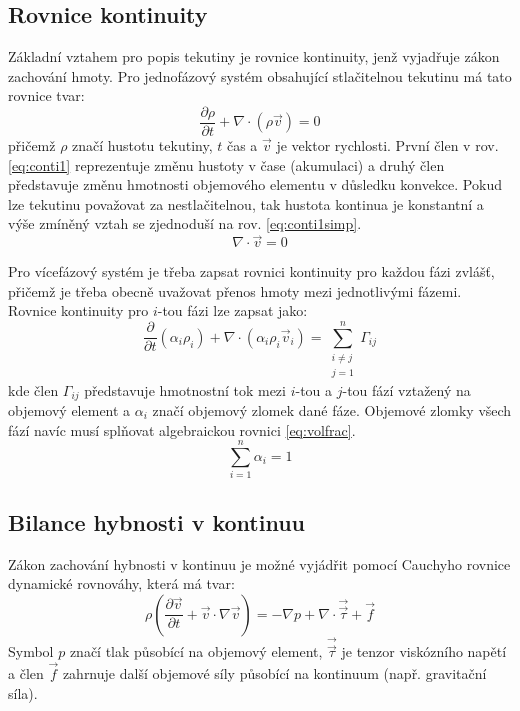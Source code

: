 \subsection{Rovnice kontinuity}

Základní vztahem pro popis tekutiny je rovnice kontinuity, jenž vyjadřuje zákon zachování hmoty. Pro jednofázový systém obsahující stlačitelnou tekutinu má tato rovnice tvar:
\begin{equation}
	\frac{\partial \rho}{\partial t} + \nabla \cdot (\rho\vec{v}) = 0
	\label{eq:conti1}
\end{equation}
přičemž $\rho$ značí hustotu tekutiny, $t$ čas a $\vec{v}$ je vektor rychlosti. První člen v rov. \ref{eq:conti1} reprezentuje změnu hustoty v čase (akumulaci) a druhý člen představuje změnu hmotnosti objemového elementu v důsledku konvekce. Pokud lze tekutinu považovat za nestlačitelnou, tak hustota kontinua je konstantní a výše zmíněný vztah se zjednoduší na rov. \ref{eq:conti1simp}.
\begin{equation}
	\nabla \cdot \vec{v} = 0
	\label{eq:conti1simp}
\end{equation}  

Pro vícefázový systém je třeba zapsat rovnici kontinuity pro každou fázi zvlášť, přičemž je třeba obecně uvažovat přenos hmoty mezi jednotlivými fázemi. Rovnice kontinuity pro $i$-tou fázi lze zapsat jako:
\begin{equation}
	\frac{\partial}{\partial t} (\alpha_{i}\rho_{i}) +  \nabla \cdot (\alpha_{i}\rho_{i}\vec{v}_{i}) = \sum_{\substack{ i \neq j \\ j=1}}^{n}\Gamma_{ij}
	\label{eq:conti2}
\end{equation} 
kde člen $\Gamma_{ij}$ představuje hmotnostní tok mezi $i$-tou a $j$-tou fází vztažený na objemový element a $\alpha_{i}$ značí objemový zlomek dané fáze. Objemové zlomky všech fází navíc musí splňovat algebraickou rovnici \ref{eq:volfrac}.
\begin{equation}
	\sum_{i=1}^n \alpha_{i} = 1
	\label{eq:volfrac}
\end{equation} 

\subsection{Bilance hybnosti v kontinuu}
Zákon zachování hybnosti v kontinuu je možné vyjádřit pomocí Cauchyho rovnice dynamické rovnováhy, která má tvar:
\begin{equation}
    \rho \left( \frac{\partial \vec{v}}{\partial t} + \vec{v} \cdot \nabla  \vec{v} \right) = -\nabla p +  \nabla \cdot \vec{\vec{\tau}} + \vec{f}
  	\label{eq:cauchy}
\end{equation} 
Symbol $p$ značí tlak působící na objemový element, $\vec{\vec{\tau}}$ je tenzor viskózního napětí a člen $\vec{f}$ zahrnuje další objemové síly působící na kontinuum (např. gravitační síla).

